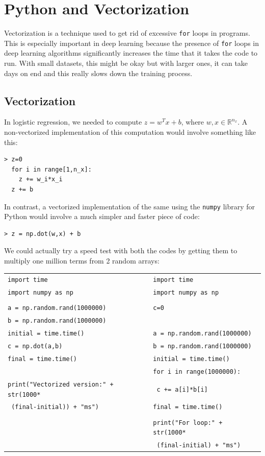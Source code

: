 \documentclass{article}[a4paper,12pt]
\theoremstyle{definition}
\begin{document}
\hrulefill
\pagebreak
\section{Python and Vectorization}
Vectorization is a technique used to get rid of excessive \texttt{for} loops in programs. This is especially important in deep learning because the presence of \texttt{for} loops in deep learning algorithms significantly increases the time that it takes the code to run. With small datasets, this might be okay but with larger ones, it can take days on end and this really slows down the training process.
\subsection{Vectorization}
In logistic regression, we needed to compute $z=w^Tx+b$, where $w,x\in\mathbb{R}^{n_x}$. A non-vectorized implementation of this computation would involve something like this:
\begin{Verbatim}
> z=0
  for i in range[1,n_x]:
 	z += w_i*x_i
  z += b
\end{Verbatim}
In contrast, a vectorized implementation of the same using the \texttt{numpy} library for Python would involve a much simpler and faster piece of code:
\begin{Verbatim}
> z = np.dot(w,x) + b
\end{Verbatim}
We could actually try a speed test with both the codes by getting them to multiply one million terms from 2 random arrays:
\begin{center}
\begin{tabular}{|l|l|}
\hline
\texttt{import time} & \texttt{import time}\\
\texttt{import numpy as np} & \texttt{import numpy as np}\\
 & \\
\texttt{a = np.random.rand(1000000)} & \texttt{c=0}\\
\texttt{b = np.random.rand(1000000)} & \\
\texttt{initial = time.time()} & \texttt{a = np.random.rand(1000000)}\\

\texttt{c = np.dot(a,b)} & \texttt{b = np.random.rand(1000000)}\\
\texttt{final = time.time()} & \texttt{initial = time.time()}\\
 & \texttt{for i in range(1000000):}\\
\texttt{print("Vectorized version:" + str(1000*} & \texttt{		c += a[i]*b[i]}\\
\texttt{		(final-initial)) + "ms")} & \texttt{final = time.time()}\\
 & \\
 & \texttt{print("For loop:" + str(1000*}\\
 & \texttt{		(final-initial) + "ms")}\\
\hline
\end{tabular}
\end{center}
\end{document}

